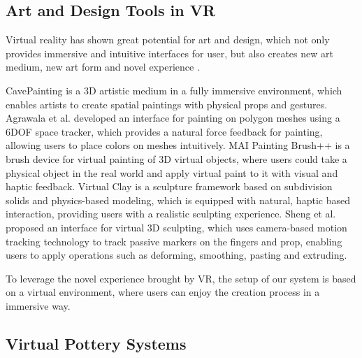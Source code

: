 \documentclass{svjour3}                     %
\begin{document}
\subsection{Art and Design Tools in VR}
\label{sec:2.2}
Virtual reality has shown great potential for art and design, which not only provides immersive and intuitive interfaces for user, but also creates new art medium, new art form and novel experience \cite{laviola20113d}.

CavePainting \cite{keefe2001cavepainting} is a 3D artistic medium in a fully immersive environment, which enables artists to create spatial paintings with physical props and gestures. Agrawala et al. \cite{agrawala19953d} developed an interface for painting on polygon meshes using a 6DOF space tracker, which provides a natural force feedback for painting, allowing users to place colors on meshes intuitively. MAI Painting Brush++ \cite{otsuki2017brush} is a brush device for virtual painting of 3D virtual objects, where users could take a physical object in the real world and apply virtual paint to it with visual and haptic feedback.
Virtual Clay \cite{mcdonnell2001virtual} is a sculpture framework based on subdivision solids and physics-based modeling, which is equipped with natural, haptic based interaction, providing users with a realistic sculpting experience. Sheng et al. \cite{sheng2006interface} proposed an interface for virtual 3D sculpting, which uses camera-based motion tracking technology to track passive markers on the fingers and prop, enabling users to apply operations such as deforming, smoothing, pasting and extruding.

To leverage the novel experience brought by VR, the setup of our system is based on a virtual environment, where users can enjoy the creation process in a immersive way.

\subsection{Virtual Pottery Systems}
\label{sec:2.3}

\end{document}
